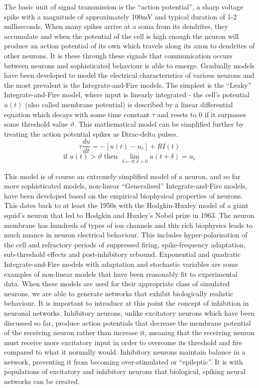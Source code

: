 \documentclass[11pt, twocolumn]{article}
\begin{document}
The basic unit of signal transmission is the ``action potential'', a sharp voltage spike with a magnitude of approximately 100mV and typical duration of 1-2 milliseconds. When many spikes arrive at a soma from its dendrites, they accumulate and when the potential of the cell is high enough the neuron will produce an action potential of its own which travels along its axon to dendrites of other neurons. It is these through these signals that communication occurs between neurons and sophisticated behaviour is able to emerge. Gradually models have been developed to model the electrical characteristics of various neurons and the most prevalent is the Integrate-and-Fire models. The simplest is the ``Leaky'' Integrate-and-Fire model, where input is linearly integrated - the cell's potential $u(t)$ (also called membrane potential) is described by a linear differential equation which decays with some time constant $\tau$ and resets to 0 if it surpasses some threshold value $\vartheta$. This mathematical model can be simplified further by treating the action potential spikes as Dirac-delta pulses.
\begin{equation}
	\tau\frac{du}{dt} = -[u(t)-u_r]+RI(t)
	\label{eqn:leaky_integrate_and_fire_differential}
\end{equation}
\begin{equation}
	\text{if } u(t) > \vartheta \text{ then } \lim\limits_{\delta\leftarrow0;\delta>0}u(t+\delta) = u_r
	\label{eqn:leaky_integrate_and_fire_threshold}
\end{equation}

This model is of course an extremely simplified model of a neuron, and so far more sophisticated models, non-linear ``Generalised'' Integrate-and-Fire models, have been developed based on the empirical biophysical properties of neurons. This dates back to at least the 1950s with the Hodgkin-Huxley model of a giant squid's neuron that led to Hodgkin and Huxley's Nobel prize in 1963. The neuron membrane has hundreds of types of ion channels and this rich biophysics leads to much nuance in neuron electrical behaviour. This includes hyper-polarisation of the cell and refractory periods of suppressed firing, spike-frequency adaptation, sub-threshold effects and post-inhibitory rebound. Exponential and quadratic Integrate-and-Fire models with adaptation and stochastic variables are some examples of non-linear models that have been reasonably fit to experimental data. When these models are used for their appropriate class of simulated neurons, we are able to generate networks that exhibit biologically realistic behaviour. It is important to introduce at this point the concept of inhibition in neuronal networks. Inhibitory neurons, unlike excitatory neurons which have been discussed so far, produce action potentials that decrease the membrane potential of the receiving neuron rather than increase it, meaning that the receiving neuron must receive more excitatory input in order to overcome its threshold and fire compared to what it normally would. Inhibitory neurons maintain balance in a network, preventing it from becoming over-stimulated or ``epileptic''. It is with populations of excitatory and inhibitory neurons that  biological, spiking neural networks can be created.
\end{document}
